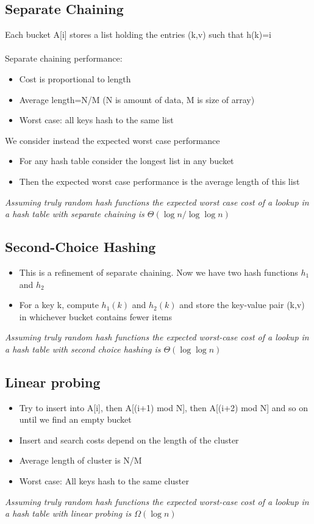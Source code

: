 \documentclass{article}[18pt]
\begin{document}
\subsection{Separate Chaining}
Each bucket A[i] stores a list holding the entries (k,v) such that h(k)=i\\
\\
Separate chaining performance:
\begin{itemize}
	\item Cost is proportional to length
	\item Average length=N/M (N is amount of data, M is size of array)
	\item Worst case: all keys hash to the same list
\end{itemize}
We consider instead the expected worst case performance
\begin{itemize}
	\item For any hash table consider the longest list in any bucket
	\item Then the expected worst case performance is the average length of this list
\end{itemize}
\begin{center}
	\textit{Assuming truly random hash functions the expected worst case cost of a lookup in a hash table with separate chaining is $\Theta(\log n/\log\log n)$}
\end{center}
\subsection{Second-Choice Hashing}
\begin{itemize}
	\item This is a refinement of separate chaining. Now we have two hash functions $h_1$ and $h_2$
	\item For a key k, compute $h_1(k)$ and $h_2(k)$ and store the key-value pair (k,v) in whichever bucket contains fewer items
\end{itemize}
\begin{center}
	\textit{Assuming truly random hash functions the expected worst-case cost of a lookup in a hash table with second choice hashing is $\Theta(\log\log n)$}
\end{center}
\subsection{Linear probing}
\begin{itemize}
	\item Try to insert into A[i], then A[(i+1) mod N], then A[(i+2) mod N] and so on until we find an empty bucket
	\item Insert and search costs depend on the length of the cluster
	\item Average length of cluster is N/M
	\item Worst case: All keys hash to the same cluster
\end{itemize}
\begin{center}
	\textit{Assuming truly random hash functions the expected worst-case cost of a lookup in a hash table with linear probing is $\Omega(\log n)$}
\end{center}
\end{document}
